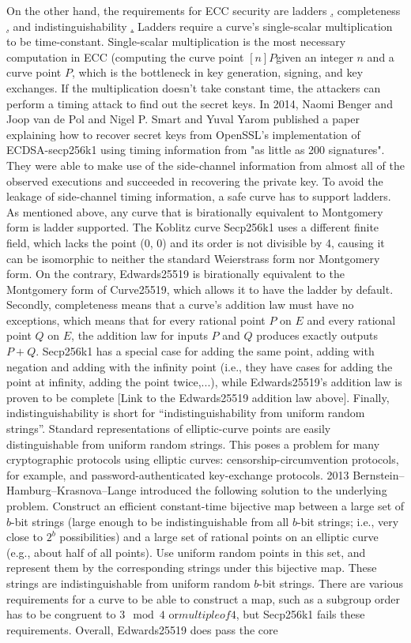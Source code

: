 On the other hand, the requirements for ECC security are ladders \href{http://safecurves.cr.yp.to/ladder.html}, completeness \href{http://safecurves.cr.yp.to/complete.html}, and indistinguishability \href{http://safecurves.cr.yp.to/ind.html}. Ladders require a curve’s single-scalar multiplication to be time-constant. Single-scalar multiplication is the most necessary computation in ECC (computing the curve point $[n]P $given an integer $n$ and a curve point $P$, which is the bottleneck in key generation, signing, and key exchanges. If the multiplication doesn’t take constant time, the attackers can perform a timing attack to find out the secret keys. In 2014, Naomi Benger and Joop van de Pol and Nigel P. Smart and Yuval Yarom published a paper explaining how to recover secret keys from OpenSSL's implementation of ECDSA-secp256k1 using timing information from "as little as 200 signatures". They were able to make use of the side-channel information from almost all of the observed executions and succeeded in recovering the private key. To avoid the leakage of side-channel timing information, a safe curve has to support ladders.  As mentioned above, any curve that is birationally equivalent to Montgomery form is ladder supported. The Koblitz curve Secp256k1 uses a different finite field, which lacks the point (0, 0) and its order is not divisible by 4, causing it can be isomorphic to neither the standard Weierstrass form nor Montgomery form. On the contrary, Edwards25519 is birationally equivalent to the Montgomery form of Curve25519, which allows it to have the ladder by default. Secondly, completeness means that a curve’s addition law must have no exceptions, which means that for every rational point $P$ on $E$ and every rational point $Q$ on $E$, the addition law for inputs $P$ and $Q$ produces exactly outputs $P + Q$. Secp256k1 has a special case for adding the same point, adding with negation and adding with the infinity point  (i.e., they have cases for adding the point at infinity, adding the point twice,...), while Edwards25519’s addition law is proven to be complete [Link to the Edwards25519 addition law above]. Finally, indistinguishability is short for “indistinguishability from uniform random strings”. Standard representations of elliptic-curve points are easily distinguishable from uniform random strings. This poses a problem for many cryptographic protocols using elliptic curves: censorship-circumvention protocols, for example, and password-authenticated key-exchange protocols. 2013 Bernstein–Hamburg–Krasnova–Lange introduced the following solution to the underlying problem. Construct an efficient constant-time bijective map between a large set of $b$-bit strings (large enough to be indistinguishable from all $b$-bit strings; i.e., very close to $2^b$ possibilities) and a large set of rational points on an elliptic curve (e.g., about half of all points). Use uniform random points in this set, and represent them by the corresponding strings under this bijective map. These strings are indistinguishable from uniform random $b$-bit strings. There are various requirements for a curve to be able to construct a map, such as a subgroup order has to be congruent to $3 \mod 4$ or$multiple of 4$, but Secp256k1 fails these requirements. Overall, Edwards25519 does pass the core 